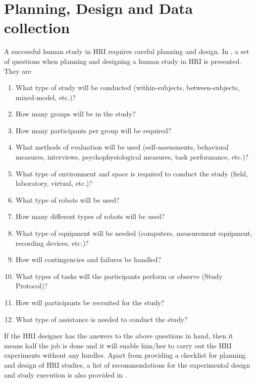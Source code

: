 {\section{Planning, Design and Data collection}
A successful human study in HRI requires careful planning and design. In \cite{bethel2010review}, a set of questions  when planning and designing a human study in HRI is presented. They are
\begin{enumerate}
\item What type of study will be conducted (within-subjects, between-subjects, mixed-model, etc.)?
\item How many groups will be in the study?
\item How many participants per group will be required?
\item What methods of evaluation will be used (self-assessments, behavioral measures, interviews, psychophysiological measures, task performance, etc.)?
\item What type of environment and space is required to conduct the study (field, laboratory, virtual, etc.)?
\item What type of robots will be used?
\item How many different types of robots will be used?
\item What type of equipment will be needed (computers, measurement equipment, recording devices, etc.)?
\item How will contingencies and failures be handled?
\item What types of tasks will the participants perform or observe (Study Protocol)?
\item How will participants be recruited for the study?
\item What type of assistance is needed to conduct the study?
\end{enumerate}
	If the HRI designer has the answers to the above questions in hand, then it means half the job is done and it will enable him/her to carry out the HRI experiments without any hurdles. Apart from providing a checklist for planning and design of HRI studies, a list of recommendations for the experimental design and study execution is also provided in \cite{bethel2010review}.
	
}
